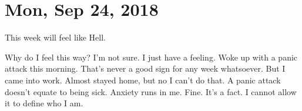 \section{Mon, Sep 24, 2018}

This week will feel like Hell.

Why do I feel this way? I'm not sure. I just have a feeling. Woke up with a panic
attack this morning. That's never a good sign for any week whatsoever. But I came
into work. Almost stayed home, but no I can't do that. A panic attack doesn't equate
to being sick. Anxiety runs in me. Fine. It's a fact. I cannot allow it to define who
I am.